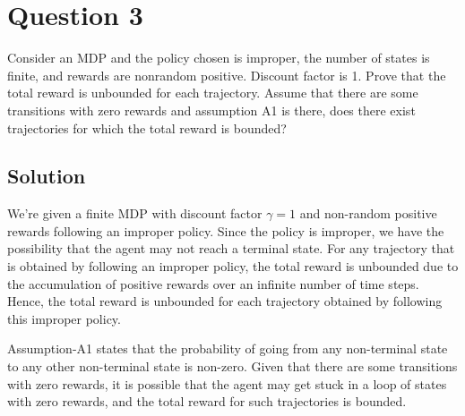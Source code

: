 \section*{Question 3}

Consider an MDP and the policy chosen is improper, the number of states is finite, and rewards are nonrandom positive.
Discount factor is 1.
Prove that the total reward is unbounded for each trajectory.
Assume that there are some transitions with zero rewards and assumption A1 is there, does there exist trajectories for which the total reward is bounded?

\subsection*{Solution}

We're given a finite MDP with discount factor \( \gamma = 1 \) and non-random positive rewards following an improper policy.
Since the policy is improper, we have the possibility that the agent may not reach a terminal state.
For any trajectory that is obtained by following an improper policy, the total reward is unbounded due to the accumulation of positive rewards over an infinite number of time steps.
Hence, the total reward is unbounded for each trajectory obtained by following this improper policy.

Assumption-A1 states that the probability of going from any non-terminal state to any other non-terminal state is non-zero.
Given that there are some transitions with zero rewards, it is possible that the agent may get stuck in a loop of states with zero rewards, and the total reward for such trajectories is bounded.
